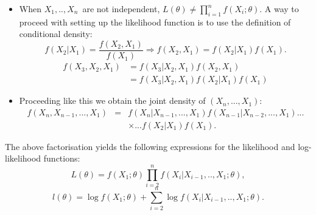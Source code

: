 \documentclass[notes=show]{beamer}
\begin{document}
\begin{frame}%


\begin{itemize}
\item When $X_{1},..,X_{n}$\ are not independent, $L\left( \theta \right)
\neq \prod\limits_{i=1}^{n}f\left( X_{i};\theta \right) $. A way to proceed
with setting up the likelihood function is to use the definition of
conditional density:%
\begin{equation*}
f\left( X_{2}|X_{1}\right) =\frac{f\left( X_{2},X_{1}\right) }{f\left(
X_{1}\right) }\Longrightarrow f\left( X_{2},X_{1}\right) =f\left(
X_{2}|X_{1}\right) f\left( X_{1}\right) .
\end{equation*}%
\begin{align*}
f\left( X_{3},X_{2},X_{1}\right) & =f\left( X_{3}|X_{2},X_{1}\right) f\left(
X_{2},X_{1}\right)  \\
& =f\left( X_{3}|X_{2},X_{1}\right) f\left( X_{2}|X_{1}\right) f\left(
X_{1}\right) 
\end{align*}

\item Proceeding like this we obtain the joint density of $\left(
X_{n},...,X_{1}\right) $:%
\begin{eqnarray*}
f\left( X_{n},X_{n-1},...,X_{1}\right)  &=&f\left(
X_{n}|X_{n-1},...,X_{1}\right) f\left( X_{n-1}|X_{n-2},...,X_{1}\right) ...
\\
&&\times ...f\left( X_{2}|X_{1}\right) f\left( X_{1}\right) .
\end{eqnarray*}
\end{itemize}

\end{frame}%

\begin{frame}%


The above factorisation yields the following expressions for the likelihood
and log-likelihood functions: 
\begin{equation*}
L\left( \theta \right) =f\left( X_{1};\theta \right)
\prod\limits_{i=2}^{n}f\left( X_{i}|X_{i-1},..,X_{1};\theta \right) ,
\end{equation*}%
\begin{equation*}
l\left( \theta \right) =\log f\left( X_{1};\theta \right)
+\sum_{i=2}^{n}\log f\left( X_{i}|X_{i-1},..,X_{1};\theta \right) .
\end{equation*}

\end{frame}%
\end{document}
